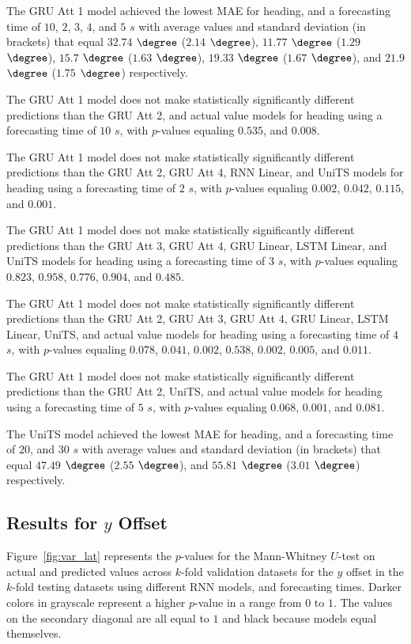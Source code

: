 The GRU Att 1 model achieved the lowest MAE for heading, and a forecasting time of $10$, $2$, $3$, $4$, and $5$ $s$ with average values and standard deviation (in brackets) that equal $32.74$ $\degree$ ($2.14$ $\degree$), $11.77$ $\degree$ ($1.29$ $\degree$), $15.7$ $\degree$ ($1.63$ $\degree$), $19.33$ $\degree$ ($1.67$ $\degree$), and $21.9$ $\degree$ ($1.75$ $\degree$) respectively.

The GRU Att 1 model does not make statistically significantly different predictions than the GRU Att 2, and actual value models for heading using a forecasting time of $10$ $s$, with $p$-values equaling $0.535$, and $0.008$.

The GRU Att 1 model does not make statistically significantly different predictions than the GRU Att 2, GRU Att 4, RNN Linear, and UniTS models for heading using a forecasting time of $2$ $s$, with $p$-values equaling $0.002$, $0.042$, $0.115$, and $0.001$.

The GRU Att 1 model does not make statistically significantly different predictions than the GRU Att 3, GRU Att 4, GRU Linear, LSTM Linear, and UniTS models for heading using a forecasting time of $3$ $s$, with $p$-values equaling $0.823$, $0.958$, $0.776$, $0.904$, and $0.485$.

The GRU Att 1 model does not make statistically significantly different predictions than the GRU Att 2, GRU Att 3, GRU Att 4, GRU Linear, LSTM Linear, UniTS, and actual value models for heading using a forecasting time of $4$ $s$, with $p$-values equaling $0.078$, $0.041$, $0.002$, $0.538$, $0.002$, $0.005$, and $0.011$.

The GRU Att 1 model does not make statistically significantly different predictions than the GRU Att 2, UniTS, and actual value models for heading using a forecasting time of $5$ $s$, with $p$-values equaling $0.068$, $0.001$, and $0.081$.

The UniTS model achieved the lowest MAE for heading, and a forecasting time of $20$, and $30$ $s$ with average values and standard deviation (in brackets) that equal $47.49$ $\degree$ ($2.55$ $\degree$), and $55.81$ $\degree$ ($3.01$ $\degree$) respectively.

\subsection{Results for $y$ Offset}

Figure~\ref{fig:var_lat} represents the $p$-values for the Mann-Whitney $U$-test on actual and predicted values across $k$-fold validation datasets for the $y$ offset in the $k$-fold testing datasets using different RNN models, and forecasting times. Darker colors in grayscale represent a higher $p$-value in a range from $0$ to $1$. The values on the secondary diagonal are all equal to $1$ and black because models equal themselves.

